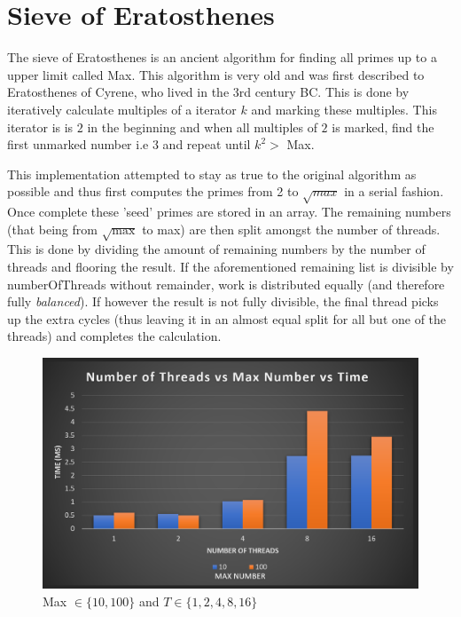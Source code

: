 \section{Sieve of Eratosthenes}

The sieve of Eratosthenes is an ancient algorithm for finding all primes up to a
upper limit called Max. This algorithm is very old and was first described to 
Eratosthenes of Cyrene, who lived in the 3rd century BC. 
\cite{eratosthenes} 
This is done by iteratively calculate multiples of a 
iterator $k$ and marking these multiples. This iterator is is $2$ in the beginning
and when all multiples of $2$ is marked, find the first unmarked number i.e $3$
and repeat until $k^2 >$ Max.

This implementation attempted to stay as true to the original algorithm as 
possible and thus first computes the primes from 2 to $\sqrt{max}$ in a serial 
fashion. Once complete these 'seed' primes are stored in an array.
The remaining numbers (that being from $\sqrt{\text{max}}$ to max) are then 
split amongst the number of threads. This is done by dividing the amount of 
remaining numbers by the number of threads and flooring the result. If the 
aforementioned remaining list is divisible by numberOfThreads without remainder, 
work is distributed equally (and therefore fully \textit{balanced}). If however the 
result is not fully divisible, the final thread picks up the extra cycles 
(thus leaving it in an almost equal split for all but one of the threads) and 
completes the calculation. 

\begin{figure}
    \centering
    \includegraphics[width=\linewidth]{Figures/maxNumLow.png}
    \caption{Max $\in \{10, 100\}$ and $T \in \{1, 2, 4, 8, 16\}$}
    \label{fig:maxnumlow}
\end{figure}

